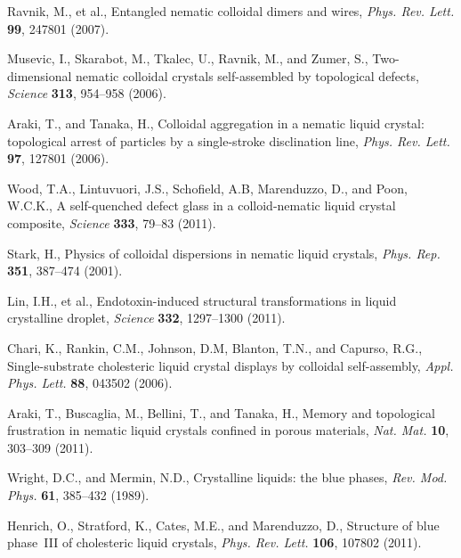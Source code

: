 \documentclass[12pt]{article}
\begin{document}
\pagebreak

\begin{thebibliography}{99}

Ravnik, M., et al.,
Entangled nematic colloidal dimers and wires, 
{\it Phys. Rev. Lett.} {\bf 99}, 247801 (2007).

Musevic, I., Skarabot, M., Tkalec, U., Ravnik, M., and Zumer, S.,
Two-dimensional nematic colloidal crystals self-assembled by topological
defects,
{\it Science} {\bf 313}, 954--958 (2006).

Araki, T., and Tanaka, H.,
Colloidal aggregation in a nematic liquid crystal: topological arrest of
particles by a single-stroke disclination line,
{\it Phys. Rev. Lett.} {\bf 97}, 127801 (2006).

Wood, T.A., Lintuvuori, J.S., Schofield, A.B, Marenduzzo, D., and
Poon, W.C.K.,
A self-quenched defect glass in a colloid-nematic liquid crystal composite,
{\it Science} {\bf 333}, 79--83 (2011).

 Stark, H.,
Physics of colloidal dispersions in nematic liquid crystals,
{\it Phys. Rep.} {\bf 351}, 387--474 (2001).

Lin, I.H., et al.,
Endotoxin-induced structural transformations in liquid crystalline droplet,
{\it Science} {\bf 332}, 1297--1300 (2011).

Chari, K., Rankin, C.M., Johnson, D.M, Blanton, T.N., and Capurso, R.G.,
Single-substrate cholesteric liquid crystal displays by colloidal
self-assembly,
{\it Appl. Phys. Lett.} {\bf 88}, 043502 (2006).

Araki, T., Buscaglia, M., Bellini, T., and Tanaka, H.,
Memory and topological frustration in nematic liquid crystals confined
in porous materials, {\it Nat. Mat.} {\bf 10}, 303--309 (2011).

 Wright, D.C., and Mermin, N.D.,
Crystalline liquids: the blue phases, {\it Rev. Mod. Phys.} {\bf 61},
385--432 (1989).

 Henrich, O., Stratford, K., Cates, M.E., and Marenduzzo, D.,
 Structure of blue phase~III of cholesteric liquid crystals,
{\it Phys. Rev. Lett.} {\bf 106}, 107802 (2011).


\end{thebibliography}
\end{document}
